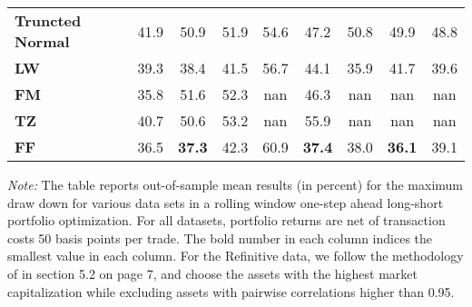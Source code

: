 \begin{table}[p]
{\begin{tabularx}{\textwidth}{Xcccccccc}
\textbf{Truncted Normal} & \cellcolor{gray!13}41.9 & \cellcolor{gray!18}50.9 & \cellcolor{gray!22}51.9 & \cellcolor{gray!40}54.6 & \cellcolor{gray!18}47.2 & \cellcolor{gray!22}50.8 & \cellcolor{gray!18}49.9 & \cellcolor{gray!27}48.8 \\
\textbf{LW} & \cellcolor{gray!31}39.3 & \cellcolor{gray!40}38.4 & \cellcolor{gray!36}41.5 & \cellcolor{gray!31}56.7 & \cellcolor{gray!27}44.1 & \cellcolor{gray!36}35.9 & \cellcolor{gray!36}41.7 & \cellcolor{gray!36}39.6 \\
\textbf{FM} & \cellcolor{gray!40}35.8 & \cellcolor{gray!13}51.6 & \cellcolor{gray!11}52.3 & \cellcolor{gray!0}nan & \cellcolor{gray!22}46.3 & \cellcolor{gray!0}nan & \cellcolor{gray!0}nan & \cellcolor{gray!0}nan \\
\textbf{TZ} & \cellcolor{gray!27}40.7 & \cellcolor{gray!22}50.6 & \cellcolor{gray!4}53.2 & \cellcolor{gray!0}nan & \cellcolor{gray!4}55.9 & \cellcolor{gray!0}nan & \cellcolor{gray!0}nan & \cellcolor{gray!0}nan \\
\textbf{FF} & \cellcolor{gray!36}36.5 & \cellcolor{gray!45}\textbf{37.3} & \cellcolor{gray!31}42.3 & \cellcolor{gray!18}60.9 & \cellcolor{gray!45}\textbf{37.4} & \cellcolor{gray!31}38.0 & \cellcolor{gray!45}\textbf{36.1} & \cellcolor{gray!40}39.1 \\
\bottomrule
\end{tabularx}
\vspace{0.3em}
{\footnotesize \textit{Note:} The table reports out-of-sample mean results (in percent) for the maximum draw down for various data sets in a rolling window one-step ahead long-short portfolio optimization. For all datasets, portfolio returns are net of transaction costs 50 basis points per trade. The bold number in each column indices the smallest value in each column. For the Refinitive data, we follow the methodology of \citet{denard2022} in section 5.2 on page 7, and choose the assets with the highest market capitalization while excluding assets with pairwise correlations higher than 0.95. }}
\end{table}